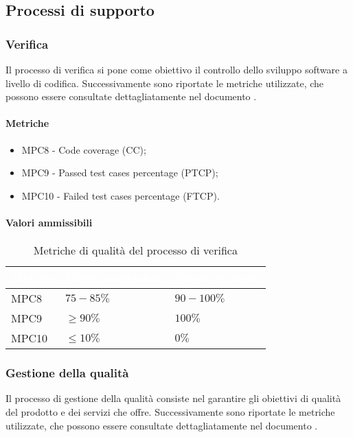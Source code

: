 \subsection{Processi di supporto}

\subsubsection{Verifica}
Il processo di verifica si pone come obiettivo il controllo dello sviluppo software a livello di codifica. Successivamente sono riportate le metriche utilizzate, che possono essere consultate dettagliatamente nel documento .

\paragraph{Metriche}

\begin{itemize}
\item MPC8 - Code coverage (CC);
\item MPC9 - Passed test cases percentage (PTCP);
\item MPC10 - Failed test cases percentage (FTCP).
 
\end{itemize}

\paragraph{Valori ammissibili}
{
\renewcommand{\arraystretch}{1.5}
\centering
\begin{longtable}{C{2.5cm} C{4cm} C{4cm}}
\textcolor{white}{\textbf{Metrica}}&
\textcolor{white}{\textbf{Valore accettabile}}&
\textcolor{white}{\textbf{Valore ottimale}}\\	
\endhead
\endfoot
{}\caption{Metriche di qualità del processo di verifica}
\endlastfoot

MPC8 & $ 75-85\% $  & $ 90-100 \% $ \\
MPC9 & $ \geq 90\% $  & $ 100 \% $ \\
MPC10 & $ \leq 10\% $  & $ 0 \% $ \\

\end{longtable}
}



\subsubsection{Gestione della qualità}
Il processo di gestione della qualità consiste nel garantire gli obiettivi di qualità del prodotto e dei servizi che offre. Successivamente sono riportate le metriche utilizzate, che possono essere consultate dettagliatamente nel documento .

